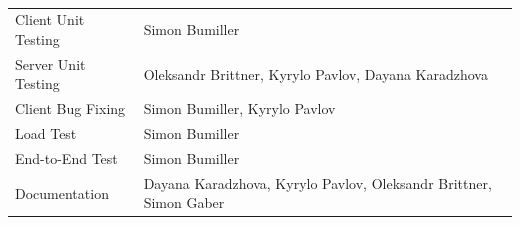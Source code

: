 {}\\[5ex]

\begin{tabular}{p{4cm}p{12cm}}
    Client Unit Testing & Simon Bumiller \\
    Server Unit Testing & Oleksandr Brittner, Kyrylo Pavlov, Dayana Karadzhova \\
    Client Bug Fixing & Simon Bumiller, Kyrylo Pavlov \\
    Load Test & Simon Bumiller \\
    End-to-End Test & Simon Bumiller \\
    Documentation & Dayana Karadzhova, Kyrylo Pavlov, Oleksandr Brittner, Simon Gaber
\end{tabular}